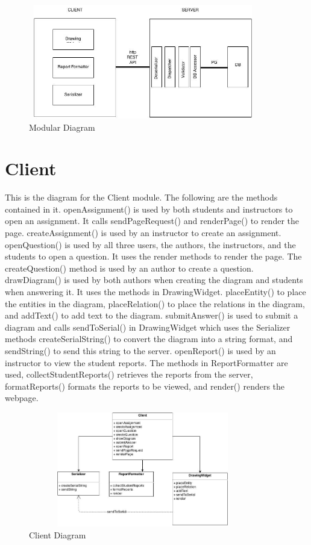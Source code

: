                         \begin{figure}[H]
            \centerline{\includegraphics[height=5cm, width=10cm]{Modular.jpg}}
            \caption{Modular Diagram}
    \end{figure}
    
    \chapter{Client}
   This is the diagram for the Client module. The following are the methods contained in it. openAssignment() is used by both students and instructors to open an assignment. It calls sendPageRequest() and renderPage() to render the page. createAssignment() is used by an instructor to create an assignment. openQuestion() is used by all three users, the authors, the instructors, and the students to open a question. It uses the render methods to render the page. The createQuestion() method is used by an author to create a question. drawDiagram() is used by both authors when creating the diagram and students when answering it. It uses the methods in DrawingWidget. placeEntity() to place the entities in the diagram, placeRelation() to place the relations in the diagram, and addText() to add text to the diagram. submitAnswer() is used to submit a diagram and calls sendToSerial() in DrawingWidget which uses the Serializer methods createSerialString() to convert the diagram into a string format, and sendString() to send this string to the server. openReport() is used by an instructor to view the student reports. The methods in ReportFormatter are used, collectStudentReports() retrieves the reports from the server, formatReports() formats the reports to be viewed, and render() renders the webpage.  
                        \begin{figure}[H]
            \centerline{\includegraphics[height=5cm, width=10cm]{Client.jpg}}
            \caption{Client Diagram}
    \end{figure}
    
